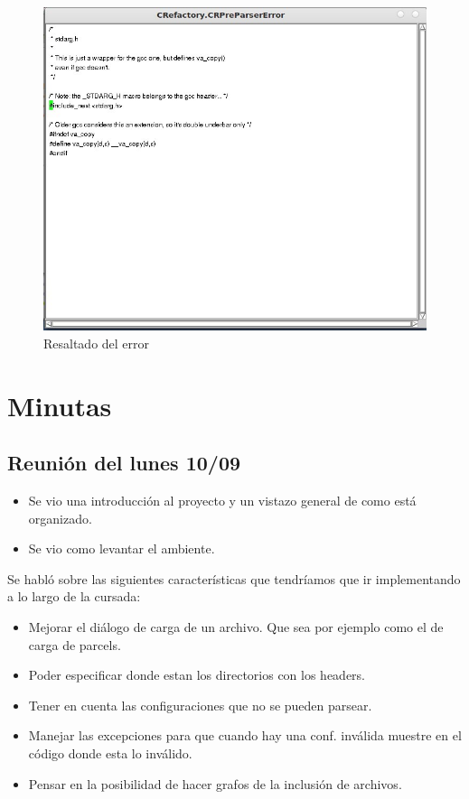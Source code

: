 \documentclass[a4paper,oneside,10pt]{article}
\begin{document}
\begin{figure}[h!]
  \centering
    \includegraphics[scale=0.50]{images/codigo_modificado/highlight_preparser.jpg}
     \caption{Resaltado del error}
\end{figure}

\section{Minutas}

\subsection{Reunión del lunes 10/09}
\begin{itemize}
  \item Se vio una introducción al proyecto y un vistazo general de como está organizado.
  \item Se vio como levantar el ambiente.
\end{itemize}

Se habló sobre las siguientes características que tendríamos que ir implementando a lo largo de la cursada:
\begin{itemize}
  \item Mejorar el diálogo de carga de un archivo. Que sea por ejemplo como el de carga de parcels.
  \item Poder especificar donde estan los directorios con los headers.
  \item Tener en cuenta las configuraciones que no se pueden parsear.
  \item Manejar las excepciones para que cuando hay una conf. inválida muestre en el código donde esta lo inválido.
  \item Pensar en la posibilidad de hacer grafos de la inclusión de archivos.
\end{itemize}
\end{document}
